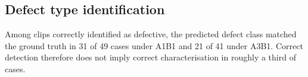 %
%
%
%
%
%
%

\subsection{Defect type identification}

Among clips correctly identified as defective, the predicted defect class
matched the ground truth in 31 of 49 cases under A1B1 and 21 of 41 under
A3B1. Correct detection therefore does not imply correct characterisation
in roughly a third of cases.



